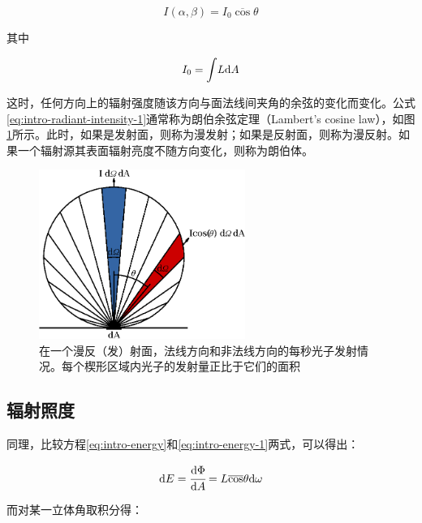 \begin{equation}\label{eq:intro-radiant-intensity-1}
	I(\alpha,\beta)=I_0 \overline{\cos}\theta 
\end{equation}

\noindent 其中

\begin{equation}
	I_0={\rm \int} L{\rm d}A
\end{equation}

这时，任何方向上的辐射强度随该方向与面法线间夹角的余弦的变化而变化。公式\ref{eq:intro-radiant-intensity-1}通常称为朗伯余弦定理（Lambert's cosine law），如图\ref{f:intro-lambert-cosine-law}所示。此时，如果是发射面，则称为漫发射；如果是反射面，则称为漫反射。如果一个辐射源其表面辐射亮度不随方向变化，则称为朗伯体。

\begin{figure}
\sidecaption
	\includegraphics[width=0.6\textwidth]{figures/intro/Lambert_Cosine_Law}
	\caption{在一个漫反（发）射面，法线方向和非法线方向的每秒光子发射情况。每个楔形区域内光子的发射量正比于它们的面积}
	\label{f:intro-lambert-cosine-law}
\end{figure}





\subsection{辐射照度}\label{sec:irradiance}
同理，比较方程\ref{eq:intro-energy}和\ref{eq:intro-energy-1}两式，可以得出：

\begin{equation}
	{\rm d}E= \cfrac{{\rm d}\Phi}{{\rm d}A}=L\overline{\cos}\theta {\rm d}\omega
\end{equation}

\noindent 而对某一立体角取积分得：

